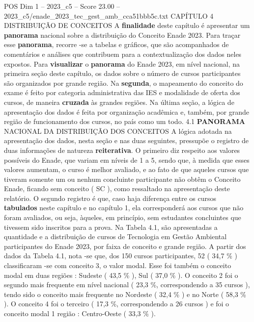 \begin{textsample}{POS Dim 1 – 2023\_c5 – Score 23.00 – 2023\_c5/enade\_2023\_tec\_gest\_amb\_cca51bbb5c.txt}  \label{ex:f1_pos_002}
CAPÍTULO 4 DISTRIBUIÇÃO DE CONCEITOS A \textbf{finalidade} deste capítulo é apresentar um \textbf{panorama} nacional sobre a distribuição do Conceito Enade 2023.
Para traçar esse \textbf{panorama}, recorre -se a tabelas e gráficos, que são acompanhados de comentários e análises que contribuem para a contextualização dos dados neles expostos.
Para \textbf{visualizar} o \textbf{panorama} do Enade 2023, em nível nacional, na primeira seção deste capítulo, os dados sobre o número de cursos participantes são organizados por grande região.
Na \textbf{segunda}, o mapeamento do conceito do exame é feito por categoria administrativa das IES e modalidade de oferta dos cursos, de maneira \textbf{cruzada} às grandes regiões.
Na última seção, a lógica de apresentação dos dados é feita por organização acadêmica e, também, por grande região de funcionamento dos cursos, no país como um todo. 4.1 \textbf{PANORAMA} NACIONAL DA DISTRIBUIÇÃO DOS CONCEITOS A lógica adotada na apresentação dos dados, nesta seção e nas duas seguintes, pressupõe o registro de duas informações de natureza \textbf{reiterativa}.
O primeiro diz respeito aos valores possíveis do Enade, que variam em níveis de 1 a 5, sendo que, à medida que esses valores aumentam, o curso é melhor avaliado, e ao fato de que aqueles cursos que tiveram somente um ou nenhum concluinte participante não obtêm o Conceito Enade, ficando sem conceito ( SC ), como ressaltado na apresentação deste relatório.
O segundo registro é que, caso haja diferença entre os cursos \textbf{tabulados} neste capítulo e no capítulo 1, ela corresponderá aos cursos que não foram avaliados, ou seja, àqueles, em princípio, sem estudantes concluintes que tivessem sido inscritos para a prova.
Na Tabela 4.1, são apresentadas a quantidade e a distribuição de cursos de Tecnologia em Gestão Ambiental participantes do Enade 2023, por faixa de conceito e grande região.
A partir dos dados da Tabela 4.1, nota -se que, dos 150 cursos participantes, 52 ( 34,7 \% ) classificaram -se com conceito 3, o valor modal.
Esse foi também o conceito modal em duas regiões : Sudeste ( 43,5 \% ), Sul ( 37,0 \% ).
O conceito 2 foi o segundo mais frequente em nível nacional ( 23,3 \%, correspondendo a 35 cursos ), tendo sido o conceito mais frequente no Nordeste ( 32,4 \% ) e no Norte ( 58,3 \% ).
O conceito 4 foi o terceiro ( 17,3 \%, correspondendo a 26 cursos ) e foi o conceito modal 1 região : Centro-Oeste ( 33,3 \% ).

\end{textsample}
